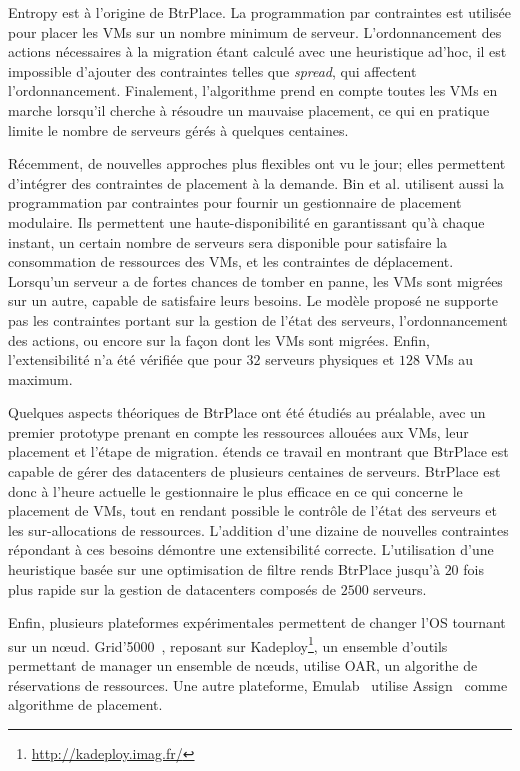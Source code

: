 \documentclass[a4paper]{article}
\begin{document}
Entropy est à l'origine de BtrPlace. La programmation par contraintes
est utilisée pour placer les VMs sur un nombre minimum de serveur.
L'ordonnancement des actions nécessaires à la migration étant calculé
avec une heuristique ad'hoc, il est impossible d'ajouter des
contraintes telles que \textit{spread}, qui affectent l'ordonnancement.
Finalement, l'algorithme prend en compte toutes les VMs en marche lorsqu'il
cherche à résoudre un mauvaise placement, ce qui en pratique limite le nombre
de serveurs gérés à quelques centaines.

Récemment, de nouvelles approches plus flexibles ont vu le jour;
elles permettent d'intégrer des contraintes de placement à la
demande. Bin et al. utilisent aussi la programmation par contraintes
pour fournir un gestionnaire de placement modulaire. Ils
permettent une haute-disponibilité en garantissant qu'à chaque instant,
un certain nombre de serveurs sera disponible pour satisfaire
la consommation de ressources des VMs, et les contraintes de
déplacement. Lorsqu'un serveur a de fortes chances de tomber en panne,
les VMs sont migrées sur un autre, capable de satisfaire leurs besoins. Le modèle
proposé ne supporte pas les contraintes portant sur la gestion de
l'état des serveurs, l'ordonnancement des actions, ou encore sur la
façon dont les VMs sont migrées. Enfin, l'extensibilité n'a été
vérifiée que pour $32$ serveurs physiques et $128$ VMs au maximum.

Quelques aspects théoriques de BtrPlace ont été étudiés au préalable,
avec un premier prototype prenant en compte les ressources allouées
aux VMs, leur placement et l'étape de migration. \cite{herm2012}
étends ce travail en montrant que BtrPlace est capable de gérer
des datacenters de plusieurs centaines de serveurs. BtrPlace
est donc à l'heure actuelle le gestionnaire le plus efficace en
ce qui concerne le placement de VMs, tout en rendant possible
le contrôle de l'état des serveurs et les sur-allocations de ressources.
L'addition d'une dizaine de nouvelles contraintes répondant à
ces besoins démontre une extensibilité correcte. L'utilisation
d'une heuristique basée sur une optimisation de filtre
rends BtrPlace jusqu'à $20$ fois plus rapide sur la gestion de
datacenters composés de $2500$ serveurs.

Enfin, plusieurs plateformes expérimentales permettent de changer
l'OS tournant sur un nœud. Grid'5000~\cite{g5k}, reposant sur
Kadeploy\footnote{\url{http://kadeploy.imag.fr/}}, un ensemble
d'outils permettant de manager un ensemble de nœuds, utilise
OAR, un algorithe de réservations de ressources. Une autre
plateforme, Emulab~\cite{emulab} utilise Assign~\cite{ricci2003solver}
comme algorithme de placement.
\end{document}
